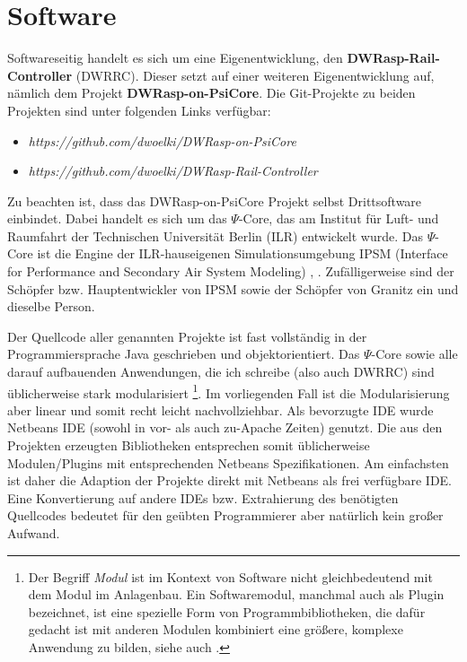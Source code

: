 \section{Software}
\label{sec:software}

Softwareseitig handelt es sich um eine Eigenentwicklung, den \textbf{DWRasp-Rail-Controller} (DWRRC).
Dieser setzt auf einer weiteren Eigenentwicklung auf, n\"amlich dem Projekt \textbf{DWRasp-on-PsiCore}.
Die Git-Projekte zu beiden Projekten sind unter folgenden Links verf\"ugbar:
\begin{itemize}
	\item \textit{https://github.com/dwoelki/DWRasp-on-PsiCore}
	\item \textit{https://github.com/dwoelki/DWRasp-Rail-Controller}
\end{itemize}
Zu beachten ist, dass das DWRasp-on-PsiCore Projekt selbst Drittsoftware einbindet.
Dabei handelt es sich um das $\Psi$-Core, das am Institut f\"ur Luft- und Raumfahrt der Technischen Universit\"at Berlin (ILR) entwickelt wurde.
Das $\Psi$-Core ist die Engine der ILR-hauseigenen Simulationsumgebung IPSM (Interface for Performance and Secondary Air System Modeling) \cite{Woe14}, \cite{Woe19c}.
Zuf\"alligerweise sind der Sch\"opfer bzw. Hauptentwickler von IPSM sowie der Sch\"opfer von Granitz ein und dieselbe Person.

Der Quellcode aller genannten Projekte ist fast vollst\"andig in der Programmiersprache Java geschrieben und objektorientiert.
Das $\Psi$-Core sowie alle darauf aufbauenden Anwendungen, die ich schreibe (also auch DWRRC) sind \"ublicherweise stark modularisiert
\footnote{Der Begriff \textit{Modul} ist im Kontext von Software nicht gleichbedeutend mit dem Modul im Anlagenbau.
Ein Softwaremodul, manchmal auch als Plugin bezeichnet, ist eine spezielle Form von Programmbibliotheken, die daf\"ur gedacht ist mit anderen Modulen kombiniert eine gr\"o{\ss}ere, komplexe Anwendung zu bilden, siehe auch \cite{Woe19c}.}.
Im vorliegenden Fall ist die Modularisierung aber linear und somit recht leicht nachvollziehbar.
Als bevorzugte IDE wurde Netbeans IDE (sowohl in vor- als auch zu-Apache Zeiten) genutzt.
Die aus den Projekten erzeugten Bibliotheken entsprechen somit \"ublicherweise Modulen/Plugins mit entsprechenden Netbeans Spezifikationen.
Am einfachsten ist daher die Adaption der Projekte direkt mit Netbeans als frei verf\"ugbare IDE.
Eine Konvertierung auf andere IDEs bzw. Extrahierung des ben\"otigten Quellcodes bedeutet f\"ur den ge\"ubten Programmierer aber nat\"urlich kein gro{\ss}er Aufwand.

